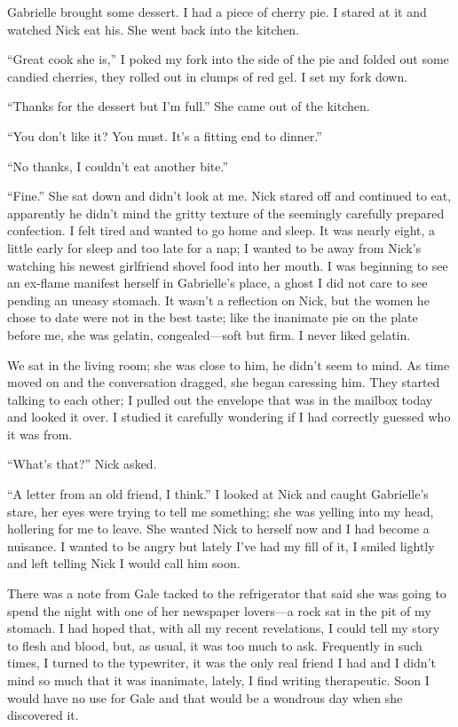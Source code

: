 Gabrielle brought some dessert. I had a piece of cherry pie. I stared at
it and watched Nick eat his. She went back into the kitchen.

``Great cook she is,'' I poked my fork into the side of the pie and
folded out some candied cherries, they rolled out in clumps of red gel.
I set my fork down.

``Thanks for the dessert but I'm full.'' She came out of the kitchen.

``You don't like it? You must. It's a fitting end to dinner.''

``No thanks, I couldn't eat another bite.''

``Fine.'' She sat down and didn't look at me. Nick stared off and
continued to eat, apparently he didn't mind the gritty texture of the
seemingly carefully prepared confection. I felt tired and wanted to go
home and sleep. It was nearly eight, a little early for sleep and too
late for a nap; I wanted to be away from Nick's watching his newest
girlfriend shovel food into her mouth. I was beginning to see an
ex-flame manifest herself in Gabrielle's place, a ghost I did not care
to see pending an uneasy stomach. It wasn't a reflection on Nick, but
the women he chose to date were not in the best taste; like the
inanimate pie on the plate before me, she was gelatin, congealed---soft
but firm. I never liked gelatin.

We sat in the living room; she was close to him, he didn't seem to mind.
As time moved on and the conversation dragged, she began caressing him.
They started talking to each other; I pulled out the envelope that was
in the mailbox today and looked it over. I studied it carefully
wondering if I had correctly guessed who it was from.

``What's that?'' Nick asked.

``A letter from an old friend, I think.'' I looked at Nick and caught
Gabrielle's stare, her eyes were trying to tell me something; she was
yelling into my head, hollering for me to leave. She wanted Nick to
herself now and I had become a nuisance. I wanted to be angry but lately
I've had my fill of it, I smiled lightly and left telling Nick I would
call him soon.

There was a note from Gale tacked to the refrigerator that said she was
going to spend the night with one of her newspaper lovers---a rock sat
in the pit of my stomach. I had hoped that, with all my recent
revelations, I could tell my story to flesh and blood, but, as usual, it
was too much to ask. Frequently in such times, I turned to the
typewriter, it was the only real friend I had and I didn't mind so much
that it was inanimate, lately, I find writing therapeutic. Soon I would
have no use for Gale and that would be a wondrous day when she
discovered it.

